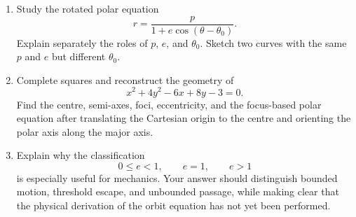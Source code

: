 \begin{enumerate}
\item Study the rotated polar equation
\[
r=\frac{p}{1+e\cos(\theta-\theta_0)}.
\]
Explain separately the roles of $p$, $e$, and $\theta_0$. Sketch two curves with
the same $p$ and $e$ but different $\theta_0$.

\item Complete squares and reconstruct the geometry of
\[
x^2+4y^2-6x+8y-3=0.
\]
Find the centre, semi-axes, foci, eccentricity, and the focus-based polar equation
after translating the Cartesian origin to the centre and orienting the polar
axis along the major axis.

\item Explain why the classification
\[
0\leq e<1,
\qquad e=1,
\qquad e>1
\]
is especially useful for mechanics. Your answer should distinguish bounded
motion, threshold escape, and unbounded passage, while making clear that the
physical derivation of the orbit equation has not yet been performed.

\end{enumerate}
